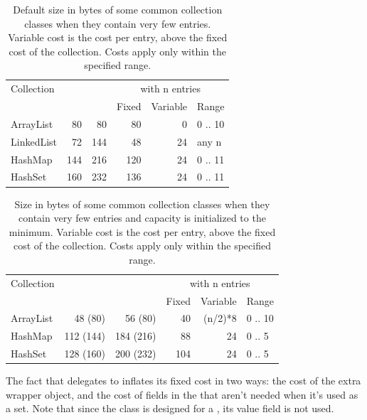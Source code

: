 \begin{table}
\centering
 		\begin{tabular}{l||r||r||rrl}
 		\toprule
	 	 Collection & \makebox{with 1 entry} & \makebox{with 4 entries} &
	 	 \multicolumn{3}{c}{with n entries}\\
	 	 & & & Fixed & Variable & Range \\
	 	 \midrule
	 	ArrayList & 80 & 80 & 80 & 0 & 0 .. 10 \\
 		LinkedList & 72 & 144 & 48 & 24 & any n \\
 		HashMap & 144 & 216 & 120 & 24 & 0 .. 11 \\
 		HashSet & 160 & 232 & 136 & 24 & 0 .. 11 \\
	 	\bottomrule
	 	\end{tabular}
	 	
	\caption{Default size in bytes of some common collection classes when they
	contain very few entries. Variable cost is the cost per entry, above the fixed
	cost of the collection. Costs apply only within the specified range.}
	\label{tab:small-collections-default}
\end{table}
\begin{table}
\centering
 		\begin{tabular}{l||r||r||rrl}
 		\toprule
	 	 Collection & \makebox{with 1 entry} & \makebox{with 4 entries} &
	 	 \multicolumn{3}{c}{with n entries}\\
	 	 & & & Fixed & Variable & Range \\
	 	 \midrule
	 	ArrayList & 48 (80)  & 56 (80) & 40 & (n/2)*8 & 0 .. 10 \\
 		HashMap & 112 (144) & 184 (216)  & 88 & 24 & 0 .. 5 \\
 		HashSet & 128 (160) & 200 (232) & 104 & 24 & 0 .. 5 \\
	 	\bottomrule
 	 	\end{tabular}
	\caption{Size in bytes of some common collection classes when they contain very few
	entries and capacity is initialized to the minimum. Variable cost is the
	cost per entry, above the fixed cost of the collection. Costs apply only within
	the specified range.}
	\label{tab:small-collections-minimum}
\end{table}

The fact that  delegates to  inflates its fixed
cost in two ways: the cost of the extra wrapper object, and the cost of fields
in the  that aren't needed when it's used as a set. 
Note that since the  class is designed for
a , its value field is not used.

